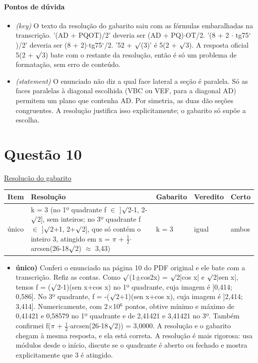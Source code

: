 \documentclass{article}%
\begin{document}
\paragraph{Pontos de dúvida}%
\begin{itemize}%
\item%
\textit{(key)} O texto da resolução do gabarito saiu com as fórmulas embaralhadas na transcrição. '(AD + PQOT)/2' deveria ser (AD + PQ)$\cdot$OT/2. '(8 + 2 $\cdot$ tg75$^\circ$)/2' deveria ser (8 + 2)$\cdot$tg75$^\circ$/2. '52 + $\surd$(3)' é 5(2 + $\surd$3). A resposta oficial 5(2 + $\surd$3) bate com o restante da resolução, então é só um problema de formatação, sem erro de conteúdo.%
\item%
\textit{(statement)} O enunciado não diz a qual face lateral a seção é paralela. Só as faces paralelas à diagonal escolhida (VBC ou VEF, para a diagonal AD) permitem um plano que contenha AD. Por simetria, as duas dão seções congruentes. A resolução justifica isso explicitamente; o gabarito só supõe a escolha.%
\end{itemize}%
\section*{Questão 10}%
\href{https://poliedroresolve.sistemapoliedro.com.br/vestibulares/ita/2027/ita-2-fase-dia-1-20-10-2026-2-fase-dia-1/dissertativa-10-matematica-2-fase-dia-1-ita-2027}{Resolução do gabarito}\par\smallskip%
\begin{longtable}{@{}p{} p{} p{} p{} p{}@{}}\toprule Item & Resolução & Gabarito & Veredito & Certo \\ \midrule
único & k = 3 (no 1º quadrante f $\in$ {]}$\surd$2-1, 2-$\surd$2{]}, sem inteiros; no 3º quadrante f $\in$ {]}$\surd$2+1, 2+$\surd$2{]}, que só contém o inteiro 3, atingido em x = $\pi$ + $\frac12$$\cdot$arcsen(26-18$\surd$2) $\approx$ 3,43) & k = 3 & igual & ambos \\
\bottomrule\end{longtable}%
\begin{itemize}%
\item%
\textbf{único)} Conferi o enunciado na página 10 do PDF original e ele bate com a transcrição. Refiz as contas. Como $\surd$(1$\pm$cos2x) = $\surd$2|cos x| e $\surd$2|sen x|, temos f = ($\surd$2-1)(sen x+cos x) no 1º quadrante, cuja imagem é {]}0,414; 0,586{]}. No 3º quadrante, f = -($\surd$2+1)(sen x+cos x), cuja imagem é {]}2,414; 3,414{]}. Numericamente, com 2$\times$10$^{6}$ pontos, obtive mínimo e máximo de 0,41421 e 0,58579 no 1º quadrante e de 2,41421 e 3,41421 no 3º. Também confirmei f($\pi$ + $\frac12$$\cdot$arcsen(26-18$\surd$2)) = 3,0000. A resolução e o gabarito chegam à mesma resposta, e ela está correta. A resolução é mais rigorosa: usa módulos desde o início, discute se o quadrante é aberto ou fechado e mostra explicitamente que 3 é atingido.%
\end{itemize}%
\end{document}

